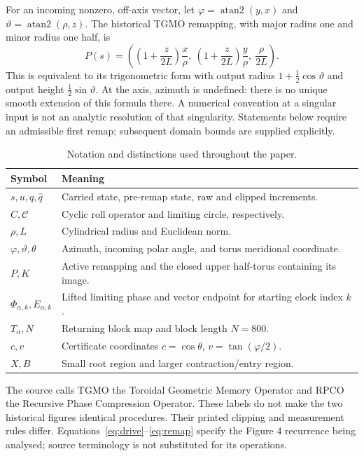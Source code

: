 \documentclass[11pt,a4paper]{article}
\numberwithin{equation}{section}
\newcommand{\Cset}{\mathcal C}
\newcommand{\atanTwo}{\operatorname{atan2}}
\begin{document}
For an incoming nonzero, off-axis vector, let $\varphi=\atanTwo(y,x)$ and $\vartheta=\atanTwo(\rho,z)$. The historical TGMO remapping, with major radius one and minor radius one half, is
\begin{equation}\label{eq:remap}
P(s)=\left(\left(1+\frac{z}{2L}\right)\frac{x}{\rho},\ 
\left(1+\frac{z}{2L}\right)\frac{y}{\rho},\ \frac{\rho}{2L}\right).
\end{equation}
This is equivalent to its trigonometric form with output radius $1+\tfrac12\cos\vartheta$ and output height $\tfrac12\sin\vartheta$. At the axis, azimuth is undefined: there is no unique smooth extension of this formula there. A numerical convention at a singular input is not an analytic resolution of that singularity. Statements below require an admissible first remap; subsequent domain bounds are supplied explicitly.

\begin{table}[htbp]
\centering\small
\caption{Notation and distinctions used throughout the paper.}\label{tab:notation}
\begin{tabular}{p{.18\textwidth}p{.74\textwidth}}
\toprule
Symbol & Meaning \\
\midrule
$s,u,q,\widehat q$ & Carried state, pre-remap state, raw and clipped increments. \\
$C,\Cset$ & Cyclic roll operator and limiting circle, respectively. \\
$\rho,L$ & Cylindrical radius and Euclidean norm. \\
$\varphi,\vartheta,\theta$ & Azimuth, incoming polar angle, and torus meridional coordinate. \\
$P,K$ & Active remapping and the closed upper half-torus containing its image. \\
$\Phi_{\alpha,k},E_{\alpha,k}$ & Lifted limiting phase and vector endpoint for starting clock index $k$. \\
$T_\alpha,N$ & Returning block map and block length $N=800$. \\
$c,v$ & Certificate coordinates $c=\cos\theta$, $v=\tan(\varphi/2)$. \\
$X,B$ & Small root region and larger contraction/entry region. \\
\bottomrule
\end{tabular}
\end{table}

The source calls TGMO the Toroidal Geometric Memory Operator and RPCO the Recursive Phase Compression Operator. These labels do not make the two historical figures identical procedures. Their printed clipping and measurement rules differ. Equations~\eqref{eq:drive}--\eqref{eq:remap} specify the Figure 4 recurrence being analysed; source terminology is not substituted for its operations.
\end{document}
